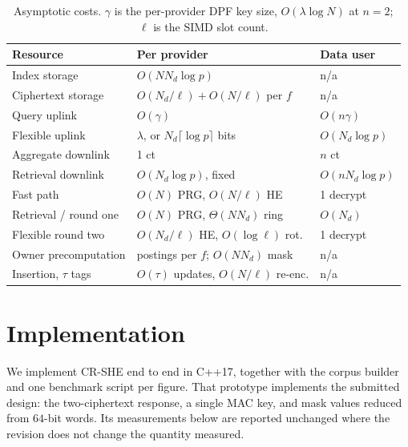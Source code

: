 \documentclass[a4paper,fleqn]{cas-dc}
\newif\ifauthorchecks
\newcommand{\authorcheck}[1]{\ifauthorchecks{\color{red}\textsf{[Authors: #1]}}\fi}
\begin{document}
\begin{table}[pos=t]
\caption{Asymptotic costs. $\gamma$ is the per-provider DPF key size,
$O(\lambda\log N)$ at $n=2$; $\ell$ is the SIMD slot count.}
\label{tab:complexity}
\centering
\scriptsize
\setlength{\tabcolsep}{2pt}
\renewcommand{\arraystretch}{1.2}
\begin{tabular*}{\tblwidth}{@{\extracolsep{\fill}}lll@{}}
\toprule
Resource & Per provider & Data user \\
\midrule
Index storage           & $O(N N_d\log p)$                  & n/a \\
Ciphertext storage      & $O(N_d/\ell)+O(N/\ell)$ per $f$   & n/a \\
Query uplink            & $O(\gamma)$                       & $O(n\gamma)$ \\
Flexible uplink         & $\lambda$, or $N_d\lceil\log p\rceil$ bits & $O(N_d\log p)$ \\
Aggregate downlink      & 1 ct                              & $n$ ct \\
Retrieval downlink      & $O(N_d\log p)$, fixed             & $O(nN_d\log p)$ \\
Fast path               & $O(N)$ PRG, $O(N/\ell)$ HE        & 1 decrypt \\
Retrieval / round one   & $O(N)$ PRG, $\Theta(NN_d)$ ring   & $O(N_d)$ \\
Flexible round two      & $O(N_d/\ell)$ HE, $O(\log\ell)$ rot.& 1 decrypt \\
Owner precomputation    & postings per $f$; $O(NN_d)$ mask  & n/a \\
Insertion, $\tau$ tags  & $O(\tau)$ updates, $O(N/\ell)$ re-enc. & n/a \\
\bottomrule
\end{tabular*}
\end{table}

\section{Implementation}
\label{sec:impl}

We implement CR-SHE end to end in C++17, together with the corpus builder
and one benchmark script per figure. That prototype implements the submitted
design: the two-ciphertext response, a single MAC key, and mask values
reduced from $64$-bit words. Its measurements below are reported unchanged
where the revision does not change the quantity measured.
\authorcheck{Publish the C++ prototype next to the reference implementation,
and re-measure in it the items marked below.}
\end{document}
